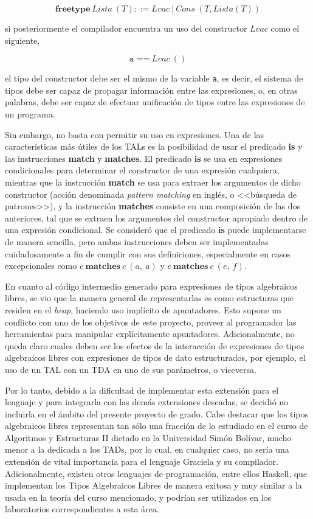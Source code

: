 {{$$ \textbf{freetype}\ Lista\ (T) ::= Lvac\ |\ Cons\ (T, Lista (T)) $$

si posteriormente el compilador encuentra un uso del constructor $Lvac$ como el
siguiente,

$$ \texttt{a ==}\  Lvac\ () $$

el tipo del constructor debe ser el mismo de la variable \texttt{a}, es decir,
el sistema de tipos debe ser capaz de propagar información entre las
expresiones, o, en otras palabras, debe ser capaz de efectuar unificación de
tipos entre las expresiones de un programa.

Sin embargo, no basta con permitir su uso en expresiones. Una de las
características más útiles de los TALs es la posibilidad de usar el predicado
\textbf{is} y las instrucciones \textbf{match} y \textbf{matches}. El predicado
\textbf{is} se usa en expresiones condicionales para determinar el constructor
de una expresión cualquiera, mientras que la instrucción \textbf{match} se usa
para extraer los argumentos de dicho constructor (acción denominada
\textit{pattern matching} en inglés, o <<búsqueda de patrones>>), y la instrucción
\textbf{matches} consiste en una composición de las dos anteriores, tal que se
extraen los argumentos del constructor apropiado dentro de una expresión
condicional. Se consideró que el predicado \textbf{is} puede implementarse de
manera sencilla, pero ambas instrucciones deben ser implementadas cuidadosamente
a fin de cumplir con sus definiciones, especialmente en casos excepcionales como
$e\ \textbf{matches}\ c\ (a,\ a)$ y $e\ \textbf{matches}\ c\ (e,\ f)$.

En cuanto al código intermedio generado para expresiones de tipos algebraicos
libres, se vio que la manera general de representarlas es como estructuras que
residen en el \emph{heap}, haciendo uso implícito de apuntadores. Esto supone un
conflicto con uno de los objetivos de este proyecto, proveer al programador las
herramientas para manipular explícitamente apuntadores. Adicionalmente, no queda
claro cuales deben ser los efectos de la interacción de expresiones de tipos
algebraicos libres con expresiones de tipos de dato estructurados, por ejemplo,
el uso de un TAL con un TDA en uno de sus parámetros, o viceversa.

Por lo tanto, debido a la dificultad de implementar esta extensión para el
lenguaje y para integrarla con las demás extensiones deseadas, se decidió no
incluirla en el ámbito del presente proyecto de grado. Cabe destacar que los
tipos algebraicos libres representan tan sólo una fracción de lo estudiado en el
curso de Algoritmos y Estructuras II dictado en la Universidad Simón Bolívar,
mucho menor a la dedicada a los TADs, por lo cual, en cualquier caso, no sería
una extensión de vital importancia para el lenguaje Graciela y su compilador.
Adicionalmente, existen otros lenguajes de programación, entre ellos Haskell,
que implementan los Tipos Algebraicos Libres de manera exitosa y muy similar a
la usada en la teoría del curso mencionado, y podrían ser utilizados en los
laboratorios correspondientes a esta área.

}}
